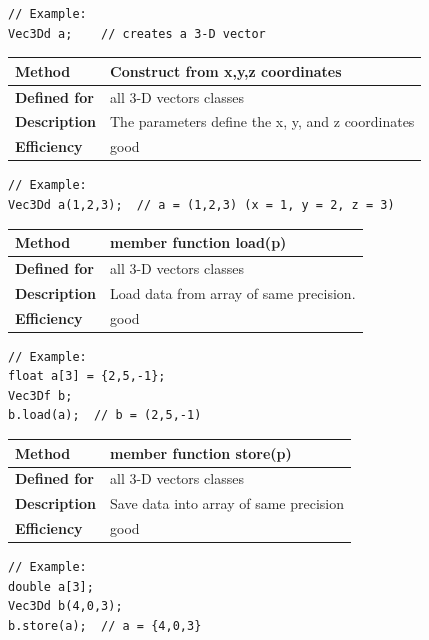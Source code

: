 \documentclass[11pt,a4paper,oneside,openright]{report}
\newcommand{\vspacesmall}{\vspace{3mm}}
\newcommand{\vspacebig}{\vspace{6mm}}
\begin{document}
\begin{lstlisting}[frame=none]
// Example:
Vec3Dd a;    // creates a 3-D vector
\end{lstlisting}
\vspacebig


\begin{tabular}{|p{25mm}|p{100mm}|}
\hline
\bfseries Method & Construct from x,y,z coordinates \\ \hline
\bfseries Defined for & all 3-D vectors classes \\ \hline
\bfseries Description & The parameters define the x, y, and z coordinates \\ \hline
\bfseries Efficiency & good \\ \hline
\end{tabular}
\vspacesmall

\begin{lstlisting}[frame=none]
// Example:
Vec3Dd a(1,2,3);  // a = (1,2,3) (x = 1, y = 2, z = 3)
\end{lstlisting}
\vspacebig

\begin{tabular}{|p{25mm}|p{100mm}|}
\hline
\bfseries Method & member function load(p) \\ \hline
\bfseries Defined for & all 3-D vectors classes \\ \hline
\bfseries Description & Load data from array of same precision. \\ \hline
\bfseries Efficiency & good \\ \hline
\end{tabular}
\vspacesmall

\begin{lstlisting}[frame=none]
// Example:
float a[3] = {2,5,-1};
Vec3Df b;
b.load(a);  // b = (2,5,-1)
\end{lstlisting}
\vspacebig


\begin{tabular}{|p{25mm}|p{100mm}|}
\hline
\bfseries Method & member function store(p) \\ \hline
\bfseries Defined for & all 3-D vectors classes \\ \hline
\bfseries Description & Save data into array of same precision \\ \hline
\bfseries Efficiency & good \\ \hline
\end{tabular}
\vspacesmall

\begin{lstlisting}[frame=none]
// Example:
double a[3];
Vec3Dd b(4,0,3);
b.store(a);  // a = {4,0,3}
\end{lstlisting}
\vspacebig
\end{document}
